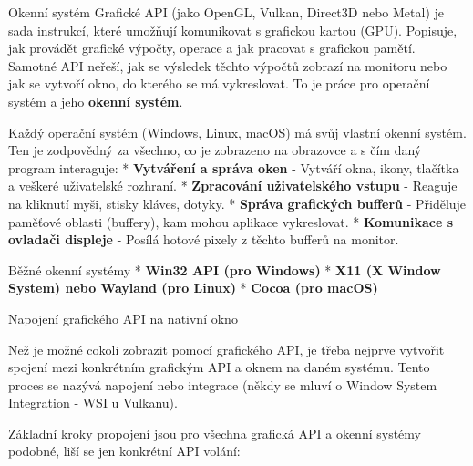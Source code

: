 \chap Okenní systém
Grafické API (jako OpenGL, Vulkan, Direct3D nebo Metal) je sada instrukcí, které umožňují komunikovat s grafickou kartou (GPU). Popisuje, jak provádět grafické výpočty, operace a jak pracovat s grafickou pamětí. Samotné API neřeší, jak se výsledek těchto výpočtů zobrazí na monitoru nebo jak se vytvoří okno, do kterého se má vykreslovat. To je práce pro operační systém a jeho {\bf okenní systém}.

Každý operační systém (Windows, Linux, macOS) má svůj vlastní okenní systém. Ten je zodpovědný za všechno, co je zobrazeno na obrazovce a s čím daný program interaguje:
\begitems
* {\bf Vytváření a správa oken} - Vytváří okna, ikony, tlačítka a veškeré uživatelské rozhraní.
* {\bf Zpracování uživatelského vstupu} - Reaguje na kliknutí myši, stisky kláves, dotyky.
* {\bf Správa grafických bufferů} - Přiděluje paměťové oblasti (buffery), kam mohou aplikace vykreslovat.
* {\bf Komunikace s ovladači displeje} - Posílá hotové pixely z těchto bufferů na monitor.
\enditems

\sec Běžné okenní systémy
\begitems
* {\bf Win32 API (pro Windows)}
* {\bf X11 (X Window System) nebo Wayland (pro Linux)}
* {\bf Cocoa (pro macOS)}
\enditems

\sec Napojení grafického API na nativní okno

Než je možné cokoli zobrazit pomocí grafického API, je třeba nejprve vytvořit spojení mezi konkrétním grafickým API a oknem na daném systému. Tento proces se nazývá napojení nebo integrace (někdy se mluví o Window System Integration - WSI u Vulkanu).

Základní kroky propojení jsou pro všechna grafická API a okenní systémy podobné, liší se jen konkrétní API volání:

